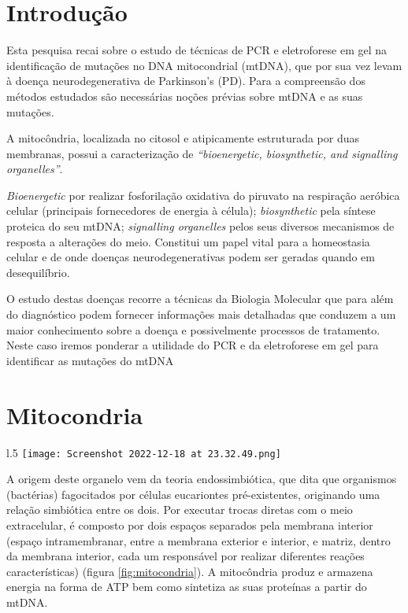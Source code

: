 \documentclass{article}
\begin{document}
    \section{Introdução}
    Esta pesquisa recai sobre o estudo de técnicas de PCR e eletroforese em gel na identificação de mutações no DNA mitocondrial (mtDNA), que por sua vez levam à doença neurodegenerativa de Parkinson's (PD). Para a compreensão dos métodos estudados são necessárias noções prévias sobre mtDNA e as suas mutações.\par
    A mitocôndria, localizada no citosol e atipicamente estruturada por duas membranas, possui a caracterização de \textit{``bioenergetic, biosynthetic, and signalling organelles''}. \cite{Wallace:2012aa}\par
    \textit{Bioenergetic} por realizar fosforilação oxidativa do piruvato na respiração aeróbica celular (principais fornecedores de energia à célula); \textit{biosynthetic} pela síntese proteica do seu mtDNA; \textit{signalling organelles} pelos seus diversos mecanismos de resposta a alterações do meio. Constitui um papel vital para a homeostasia celular e de onde doenças neurodegenerativas podem ser geradas quando em desequilíbrio. \cite{Sharma:2019aa}\par
    O estudo destas doenças recorre a técnicas da Biologia Molecular que para além do diagnóstico podem fornecer informações mais detalhadas que conduzem a um maior conhecimento sobre a doença e possivelmente processos de tratamento. Neste caso iremos ponderar a utilidade do PCR e da eletroforese em gel para identificar as mutações do mtDNA
    
    \section{Mitocondria}
    \begin{wrapfigure}{l}{.5\textwidth}
        \centering
        \vspace{-2ex}
        \texttt{[image: Screenshot 2022-12-18 at 23.32.49.png]}
        \caption{Esquema e localização celular da mitocondria [2022, MUACHO]}
        \label{fig:mitocondria}
        \vspace{-3ex}
    \end{wrapfigure}
    A origem deste organelo vem da teoria endossimbiótica, que dita que organismos (bactérias) fagocitados por células eucariontes pré-existentes, originando uma relação simbiótica entre os dois. Por executar trocas diretas com o meio extracelular, é composto por dois espaços separados pela membrana interior (espaço intramembranar, entre a membrana exterior e interior, e matriz, dentro da membrana interior, cada um responsável por realizar diferentes reações características) \cite{Roger:2017aa} (figura \ref{fig:mitocondria}). A mitocôndria produz e armazena energia na forma de ATP bem como sintetiza as suas proteínas a partir do mtDNA.
\end{document}
